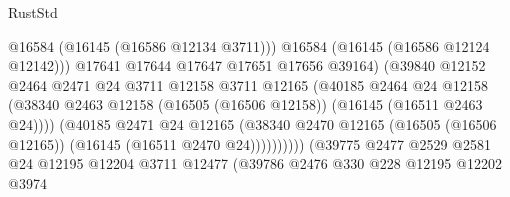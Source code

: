 \begin{lexlean}{RustStd}
\begin{coremodule}
                                              @16584
                                              (@16145 (@16586 @12134 @3711)))
                                            @16584
                                            (@16145 (@16586 @12124 @12142)))
                                          @17641
                                          @17644
                                          @17647
                                          @17651
                                          @17656
                                          @39164)
                                        (@39840
                                          @12152
                                          @2464
                                          @2471
                                          @24
                                          @3711
                                          @12158
                                          @3711
                                          @12165
                                          (@40185
                                            @2464
                                            @24
                                            @12158
                                            (@38340
                                              @2463
                                              @12158
                                              (@16505 (@16506 @12158))
                                              (@16145 (@16511 @2463 @24))))
                                          (@40185
                                            @2471
                                            @24
                                            @12165
                                            (@38340
                                              @2470
                                              @12165
                                              (@16505 (@16506 @12165))
                                              (@16145 (@16511 @2470 @24))))))))))
                              (@39775
                                @2477
                                @2529
                                @2581
                                @24
                                @12195
                                @12204
                                @3711
                                @12477
                                (@39786
                                  @2476
                                  @330
                                  @228
                                  @12195
                                  @12202
                                  @3974

\end{coremodule}
\end{lexlean}
